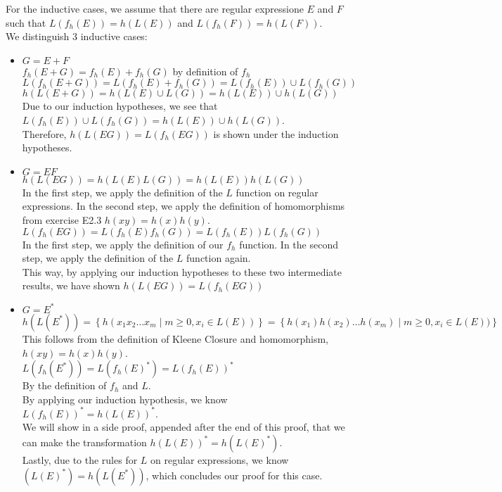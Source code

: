 For the inductive cases, we assume that there are regular expressione $E$ and $F$ such that $L(f_{h}(E)) = h(L(E))$ and $L(f_{h}(F)) = h(L(F))$.\\
We distinguish 3 inductive cases:\\
\begin{itemize}
    \item $G = E + F$\\
    $f_{h}(E+G) = f_{h}(E) + f_{h}(G)$ by definition of $f_{h}$\\
    $L(f_{h}(E+G)) = L(f_{h}(E) + f_{h}(G)) = L(f_{h}(E)) \cup L(f_{h}(G))$\\
    $h(L(E+G)) = h(L(E)\cup L(G)) = h(L(E)) \cup h(L(G))$\\
    Due to our induction hypotheses, we see that $L(f_{h}(E)) \cup L(f_{h}(G)) = h(L(E)) \cup h(L(G))$.\\
    Therefore, $h(L(EG)) = L(f_{h}(EG))$ is shown under the induction hypotheses.\\
    \item $G = EF$\\
    $h(L(EG)) = h(L(E)L(G)) = h(L(E))h(L(G))$\\
    In the first step, we apply the definition of the $L$ function on regular expressions. In the second step, we apply the definition of homomorphisms from exercise E2.3 $h(xy)=h(x)h(y)$.\\
    $L(f_{h}(EG)) = L(f_{h}(E)f_{h}(G)) = L(f_{h}(E))L(f_{h}(G))$\\
    In the first step, we apply the definition of our $f_{h}$ function. In the second step, we apply the definition of the $L$ function again.\\
    This way, by applying our induction hypotheses to these two intermediate results, we have shown $h(L(EG)) = L(f_{h}(EG))$\\
    \item $G = E^{\ast}$\\
    $h(L(E^{\ast})) = \left\{ h(x_{1}x_{2}\ldots x_{m} \mid m \geq 0, x_{i} \in L(E))\right\} = \left\{ h(x_{1})h(x_{2})\ldots h(x_{m}) \mid m \geq 0, x_{i} \in L(E))\right\}$\\
    This follows from the definition of Kleene Closure and homomorphism, $h(xy)=h(x)h(y)$.\\
    $L(f_{h}(E^{\ast})) = L(f_{h}(E)^{\ast}) = L(f_{h}(E))^{\ast}$\\
    By the definition of $f_{h}$ and $L$.\\
    By applying our induction hypothesis, we know $L(f_{h}(E))^{\ast} = h(L(E))^{\ast}$.\\
    We will show in a side proof, appended after the end of this proof, that we can make the transformation $h(L(E))^{\ast} = h(L(E)^{\ast})$.\\
    Lastly, due to the rules for $L$ on regular expressions, we know $(L(E)^{\ast}) = h(L(E^{\ast}))$, which concludes our proof for this case.\\
\end{itemize}


